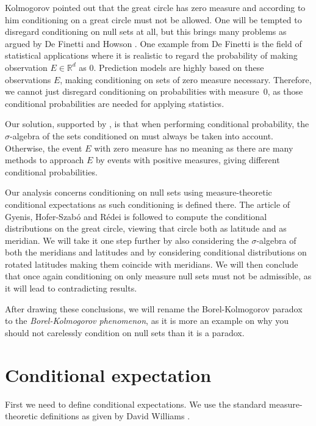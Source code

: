 \documentclass[a4paper]{report}
\theoremstyle{plain}
\theoremstyle{definition}
\theoremstyle{remark}
\numberwithin{equation}{chapter}
\newcommand{\R}{\mathbb{R}}
\DeclareMathOperator{\1}{\mathbbm{1}}
\begin{document}
Kolmogorov \cite{Kolmogorov33} pointed out that the great circle has zero measure and according to him conditioning on a great circle must not be allowed. One will be tempted to disregard conditioning on null sets at all, but this brings many problems as argued by De Finetti \cite{Finetti72} and Howson \cite{Howson14}. One example from De Finetti is the field of statistical applications where it is realistic to regard the probability of making observation $E\in\R^d$ as $0$. Prediction models are highly based on these observations $E$, making conditioning on sets of zero measure necessary. Therefore, we cannot just disregard conditioning on probabilities with measure~$0$, as those conditional probabilities are needed for applying statistics.

Our solution, supported by \cite{Rao88,Billingsley95,Proschan98,Easwaran08,Myrvold15,Gyenis17}, is that when performing conditional probability, the $\sigma$-algebra of the sets conditioned on must always be taken into account. Otherwise, the event $E$ with zero measure has no meaning as there are many methods to approach $E$ by events with positive measures, giving different conditional probabilities. 

Our analysis concerns conditioning on null sets using measure-theoretic conditional expectations as such conditioning is defined there. The article of Gyenis, Hofer-Szabó and Rédei \cite{Gyenis17} is followed to compute the conditional distributions on the great circle, viewing that circle both as latitude and as meridian. We will take it one step further by also considering the $\sigma$-algebra of both the meridians and latitudes and by considering conditional distributions on rotated latitudes making them coincide with meridians. We will then conclude that once again conditioning on only measure null sets must not be admissible, as it will lead to contradicting results.

After drawing these conclusions, we will rename the Borel-Kolmogorov paradox to the \emph{Borel-Kolmogorov phenomenon}, as it is more an example on why you should not carelessly condition on null sets than it is a paradox.

\section{Conditional expectation}
First we need to define conditional expectations. We use the standard measure-theoretic definitions as given by David Williams \cite{Williams91}.
\end{document}
